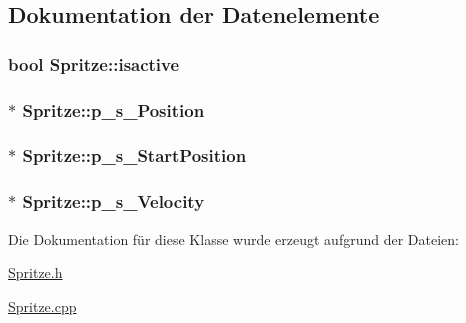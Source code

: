\subsection{Dokumentation der Datenelemente}
\hypertarget{class_spritze_a313b06a86c7b0d082c2479e9e35a8b4d}{
\subsubsection[{isactive}]{\setlength{\rightskip}{0pt plus 5cm}bool Spritze\-::isactive\hspace{0.3cm}{\ttfamily [private]}}}\label{class_spritze_a313b06a86c7b0d082c2479e9e35a8b4d}
\hypertarget{class_spritze_a209c9c2761b8fa8503543276cd01de6a}{
\subsubsection[{p\-\_\-s\-\_\-\-Position}]{$\ast$ Spritze\-::p\-\_\-s\-\_\-\-Position\hspace{0.3cm}{\ttfamily [private]}}}\label{class_spritze_a209c9c2761b8fa8503543276cd01de6a}
\hypertarget{class_spritze_ab2aa8224814d8de17367b7499341fe2e}{
\subsubsection[{p\-\_\-s\-\_\-\-Start\-Position}]{$\ast$ Spritze\-::p\-\_\-s\-\_\-\-Start\-Position\hspace{0.3cm}{\ttfamily [private]}}}\label{class_spritze_ab2aa8224814d8de17367b7499341fe2e}
\hypertarget{class_spritze_ab77cbb384ea5d2b34f9da2829e7e9a12}{
\subsubsection[{p\-\_\-s\-\_\-\-Velocity}]{$\ast$ Spritze\-::p\-\_\-s\-\_\-\-Velocity\hspace{0.3cm}{\ttfamily [private]}}}\label{class_spritze_ab77cbb384ea5d2b34f9da2829e7e9a12}


Die Dokumentation für diese Klasse wurde erzeugt aufgrund der Dateien\-:\begin{DoxyCompactItemize}
\item 
\hyperlink{_spritze_8h}{Spritze.\-h}\item 
\hyperlink{_spritze_8cpp}{Spritze.\-cpp}\end{DoxyCompactItemize}
